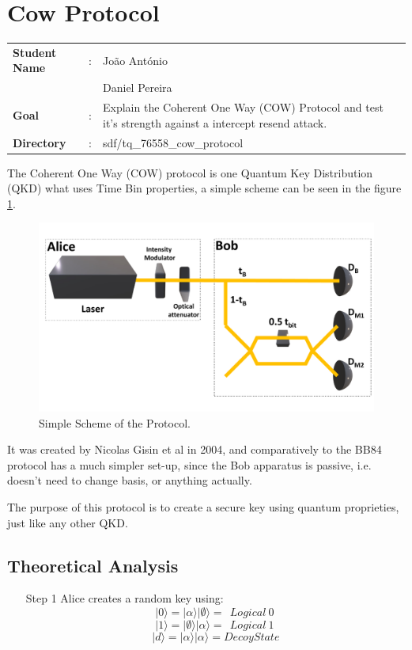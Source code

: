 \clearpage
\section{Cow Protocol}

\begin{refsection}

\begin{tcolorbox}	
\begin{tabular}{p{2.75cm} p{0.2cm} p{10.5cm}} 	
\textbf{Student Name}  &:&  Jo\~ao Ant\'onio\\
\textbf{}  & &  Daniel Pereira\\
\textbf{Goal}          &:& Explain the Coherent One Way (COW) Protocol and test it's strength against a intercept resend attack.\\
\textbf{Directory}              &:& sdf/tq_76558_cow_protocol
\end{tabular}
\end{tcolorbox}

The Coherent One Way (COW) protocol is one Quantum Key Distribution (QKD) what uses Time Bin properties, a simple scheme can be seen in the figure \ref{fig:Scheme}.

\begin{figure}[h]
\centering
\includegraphics[width=.4\linewidth]{./sdf/tq_76558_cow_protocol/slides/figures/Full2.pdf}
\caption{Simple Scheme of the Protocol.}
\label{fig:Scheme}
\end{figure}

\par
It was created by Nicolas Gisin et al in 2004, and comparatively to the BB84 protocol has a much simpler set-up, since the Bob apparatus is passive, i.e. doesn't need to change basis, or anything actually.
\par
The purpose of this protocol is to create a secure key using quantum proprieties, just like any other QKD.

\subsection{Theoretical Analysis}

\begin{itemize}
\item [Step 1] Alice creates a random key using:
$$|0\rangle = |\alpha\rangle |\emptyset\rangle =\ \ Logical\ 0\ $$
  $$|1\rangle = |\emptyset\rangle |\alpha\rangle =\ \ Logical\ 1\ $$
$$|d\rangle = |\alpha\rangle |\alpha\rangle = Decoy State$$


\end{itemize}
\end{refsection}
